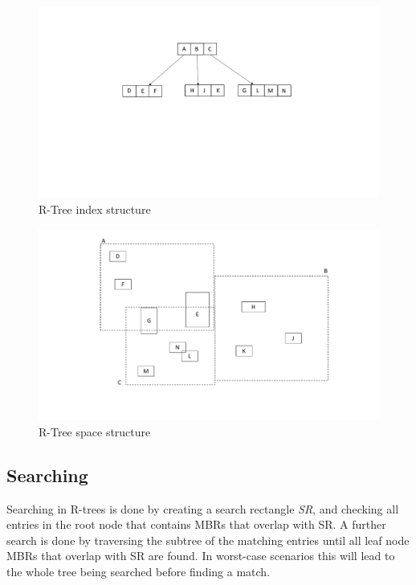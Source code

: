 \begin{figure}[ht]
    \centering
    \includegraphics[scale=0.4]{figures/RTree.pdf}
    \caption{R-Tree index structure}
    \label{fig:RTree}
\end{figure}

\begin{figure}[ht]
    \centering
    \includegraphics[scale=0.3]{figures/RTree_space.pdf}
    \caption{R-Tree space structure}
    \label{fig:RtreeSpace}
\end{figure}

\subsection{Searching}
Searching in R-trees is done by creating a search rectangle \emph{SR}, and checking all entries in the root node that contains MBRs that overlap with SR. A further search is done by traversing the subtree of the matching entries until all leaf node MBRs that overlap with SR are found. In worst-case scenarios this will lead to the whole tree being searched before finding a match. 

